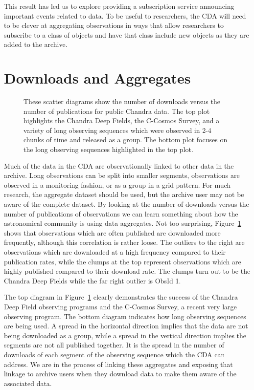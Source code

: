 This result has led us to explore providing a subscription service announcing important events related to data.  To be useful to researchers, the CDA will need to be clever at aggregating observations in ways that allow researchers to subscribe to a class of objects and have that class include new objects as they are added to the archive.

\section{Downloads and Aggregates}

\begin{figure}[here]
\caption[DownloadsVsPubs]
 { \label{fig:DownloadsVsPubs}
These scatter diagrams show the number of downloads versus the number of publications for public Chandra data.  The top plot highlights the Chandra Deep Fields, the C-Cosmos Survey, and a variety of long observing sequences which were observed in 2-4 chunks of time and released as a group.  The bottom plot focuses on the long observing sequences highlighted in the top plot. }
\end{figure}

Much of the data in the CDA are observationally linked to other data in the archive.  Long observations can be split into smaller segments, observations are observed in a monitoring fashion, or as a group in a grid pattern.  For much research, the aggregate dataset should be used, but the archive user may not be aware of the complete dataset.  By looking at the number of downloads versus the number of publications of observations we can learn something about how the astronomical community is using data aggregates.  Not too surprising, Figure~\ref{fig:DownloadsVsPubs} shows that observations which are often published are downloaded more frequently, although this correlation is rather loose.  The outliers to the right are observations which are downloaded at a high frequency compared to their publication rates, while the clumps at the top represent observations which are highly published compared to their download rate.  The clumps turn out to be the Chandra Deep Fields while the far right outlier is ObsId 1. 

The top diagram in Figure~\ref{fig:DownloadsVsPubs} clearly demonstrates the success of the Chandra Deep Field observing programs and the C-Cosmos Survey, a recent very large observing program.  The bottom diagram indicates how long observing sequences are being used.  A spread in the horizontal direction implies that the data are not being downloaded as a group, while a spread in the vertical direction implies the segments are not all published together.  It is the spread in the number of downloads of each segment of the observing sequence which the CDA can address.  We are in the process of linking these aggregates and exposing that linkage to archive users when they download data to make them aware of the associated data.    

